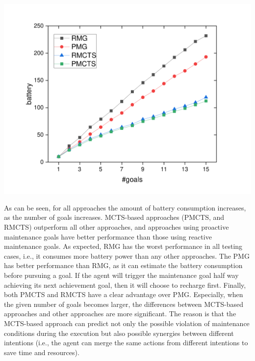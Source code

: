 \documentclass[a0, portrait]{a0poster}
\begin{document}
\begin{multicols}{3}
\begin{center}\vspace{1cm}
\includegraphics[scale=1]{./figs/gX_cY_fixCap40.pdf}
\label{fig:static1}
\end{center}\vspace{1cm}

As can be seen, for all approaches the amount of battery consumption increases, as the number of goals increases.
MCTS-based approaches (PMCTS, and RMCTS) outperform all other approaches, and approaches using proactive maintenance goals have better performance than those using reactive maintenance goals.
As expected, RMG has the worst performance in all testing cases, i.e., it consumes more battery power than any other approaches.
The PMG has better performance than RMG, as it can estimate the battery consumption before pursuing a goal. If the agent will trigger the maintenance goal half way achieving its next achievement goal, then it will choose to recharge first.
Finally, both PMCTS and RMCTS have a clear advantage over PMG. Especially, when the given number of goals becomes larger, the differences between MCTS-based approaches and other approaches are more significant. The reason is that the MCTS-based approach can predict not only the possible violation of maintenance conditions during the execution but also possible synergies between different intentions (i.e., the agent can merge the same actions from different intentions to save time and resources).


\end{multicols}
\end{document}
